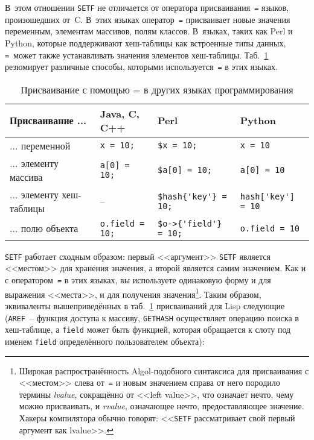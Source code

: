 В~этом отношении \lstinline{SETF} не отличается от оператора присваивания~\lstinline{=} языков,
произошедших от~C. В~этих языках оператор~\lstinline{=} присваивает новые значения переменным,
элементам массивов, полям классов. В~языках, таких как Perl и Python, которые поддерживают
хеш-таблицы как встроенные типы данных, \lstinline{=}~может также устанавливать значения
элементов хеш-таблицы. Таб.~\ref{table:06-1} резюмирует различные способы, которыми
используется~\lstinline{=} в этих языках.

\begin{table}[h]
\begin{tabular}{|m{42mm}|>{\centering}m{23mm}|>{\centering}m{30mm}|>{\centering}m{25mm}|}
\hline
Присваивание ...         & Java, C, C++        & Perl                & Python \\
\hline
... переменной           & \lstinline!x = 10;! & \lstinline!$x = 10;! & \lstinline!x = 10! \\
... элементу массива     & \lstinline!a[0] = 10;! & \lstinline!$a[0] = 10;! & \lstinline!a[0] = 10! \\
... элементу хеш-таблицы & --                  & \lstinline!$hash{'key'} = 10;!  & \lstinline!hash['key'] = 10! \\
... полю объекта         & \lstinline!o.field = 10;! & \lstinline!$o->{'field'} = 10;! & \lstinline!o.field = 10! \\
\hline
\end{tabular}
  \caption{Присваивание с помощью = в других языках программирования} 
  \label{table:06-1}
\end{table}


\lstinline{SETF} работает сходным образом: первый <<аргумент>> \lstinline{SETF} является
<<местом>> для хранения значения, а второй является самим значением. Как и с оператором~\lstinline{=}
в этих языках, вы используете одинаковую форму и для выражения <<места>>, и для
получения значения\footnote{Широкая распространённость Algol-подобного синтаксиса для
  присваивания с <<местом>> слева от~\lstinline{=} и новым значением справа от него породило термины
  \textit{lvalue}, сокращённо от <<left value>>, что означает нечто, чему можно
  присваивать, и \textit{rvalue}, означающее нечто, предоставляющее значение. Хакеры
  компилятора обычно говорят: <<\lstinline{SETF} рассматривает свой первый аргумент как
  lvalue>>.}\hspace{\footnotenegspace}. Таким образом, эквиваленты вышеприведённых в таб.~\ref{table:06-1} присваиваний для
Lisp следующие (\lstinline{AREF}~-- функция доступа к массиву, \lstinline{GETHASH} осуществляет
операцию поиска в хеш-таблице, а \lstinline{field} может быть функцией, которая обращается к слоту под
именем \lstinline{field} определённого пользователем объекта):


